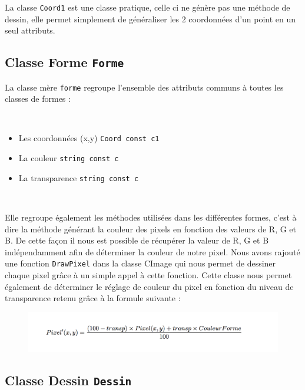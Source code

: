 \documentclass[11pt]{article}
\begin{document}
La classe \texttt{Coord1} est une classe pratique, celle ci ne génère pas une méthode de dessin, elle permet simplement de généraliser les 2 coordonnées d'un point en un seul attributs.

\clearpage

\subsection{Classe Forme \texttt{Forme}}

La classe mère \texttt{forme} regroupe l'ensemble des attributs communs à toutes les classes de formes :

\
\

\begin{itemize}
    \item Les coordonnées (x,y) \texttt{Coord const c1}
    \item La couleur \texttt{string const c}
    \item La transparence \texttt{string const c}
\end{itemize} 

\
\

Elle regroupe également les méthodes utilisées dans les différentes formes, c'est à dire la méthode générant la couleur des pixels en fonction des valeurs de R, G et B. De cette façon il nous est possible de récupérer la valeur de R, G et B indépendamment afin de déterminer la couleur de notre pixel. Nous avons rajouté une fonction \texttt{DrawPixel} dans la classe CImage qui nous permet de dessiner chaque pixel grâce à un simple appel à cette fonction. Cette classe nous permet également de déterminer le réglage de couleur du pixel en fonction du niveau de transparence retenu grâce à la formule suivante : 

\begin{figure}[!htbp]
    \begin{center}
        \includegraphics[width=12cm]{Formule.png}
    \centering
    \end{center}
\end{figure}


\subsection{Classe Dessin \texttt{Dessin}}
\end{document}
